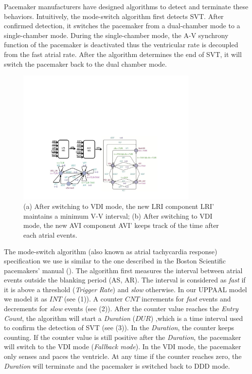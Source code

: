 Pacemaker manufacturers have designed algorithms to detect and terminate these behaviors. Intuitively, the mode-switch algorithm first detects SVT. After confirmed detection, it switches the pacemaker from a dual-chamber mode to a single-chamber mode. During the single-chamber mode, the A-V synchrony function of the pacemaker is deactivated thus the ventricular rate is decoupled from the fast atrial rate. After the algorithm determines the end of SVT, it will switch the pacemaker back to the dual chamber mode. 
\begin{figure}
		\centering
		\includegraphics[width=0.8\textwidth]{figs/AVI_ms.pdf}
		\caption{\small (a) After switching to \textsf{VDI} mode, the new LRI component \textsf{LRI'} maintains a minimum V-V interval; (b) After switching to \textsf{VDI} mode, the new AVI component \textsf{AVI'} keeps track of the time after each atrial events.}
		\label{fig:avi_ms}
\end{figure}
The mode-switch algorithm (also known as atrial tachycardia response) specification we use is similar to the one described in the Boston Scientific pacemakers' manual (\cite{compass}). The algorithm first measures the interval between atrial events outside the blanking period (AS, AR). The interval is considered as \emph{fast} if it is above a threshold (\emph{Trigger Rate}) and \emph{slow} otherwise. In our UPPAAL model we model it as $INT$ (see  (1)). A counter $CNT$ increments for \emph{fast} events and decrements for \emph{slow} events (see  (2)). After the counter value reaches the \emph{Entry Count}, the algorithm will start a \emph{Duration} ($DUR$) ,which is a time interval used to confirm the detection of SVT (see  (3)). In the \emph{Duration}, the counter keeps counting. If the counter value is still positive after the \emph{Duration}, the pacemaker will switch to the VDI mode (\emph{Fallback mode}). In the VDI mode, the pacemaker only senses and paces the ventricle. At any time if the counter reaches zero, the \emph{Duration} will terminate and the pacemaker is switched back to DDD mode.
